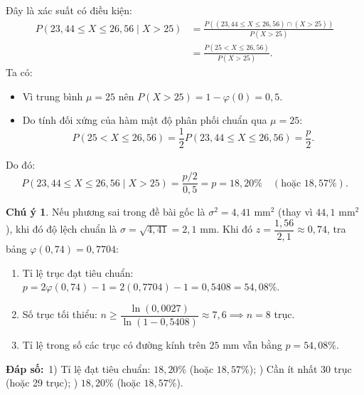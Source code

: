 \documentclass[12pt,a4paper]{article}
\theoremstyle{definition}
\newtheorem*{chuy}{Chú ý}
\newcommand{\dapso}[1]{\noindent\textbf{Đáp số:}\ #1}
\begin{document}
\begin{enumerate}[label=\arabic*)]
    Đây là xác suất có điều kiện:
    \begin{align*}
    P(23{,}44 \le X \le 26{,}56 \mid X > 25) &= \frac{P((23{,}44 \le X \le 26{,}56) \cap (X > 25))}{P(X > 25)} \\
    &= \frac{P(25 < X \le 26{,}56)}{P(X > 25)}.
    \end{align*}
    Ta có:
    \begin{itemize}
        \item Vì trung bình $\mu = 25$ nên $P(X > 25) = 1 - \varphi(0) = 0{,}5$.
        \item Do tính đối xứng của hàm mật độ phân phối chuẩn qua $\mu = 25$:
        \[
        P(25 < X \le 26{,}56) = \frac{1}{2} P(23{,}44 \le X \le 26{,}56) = \frac{p}{2}.
        \]
    \end{itemize}
    Do đó:
    \[
    P(23{,}44 \le X \le 26{,}56 \mid X > 25) = \frac{p / 2}{0{,}5} = p = 18{,}20\% \quad (\text{hoặc } 18{,}57\%).
    \]
\end{enumerate}

\begin{chuy}
Nếu phương sai trong đề bài gốc là $\sigma^2 = 4{,}41\text{ mm}^2$ (thay vì $44{,}1\text{ mm}^2$), khi đó độ lệch chuẩn là $\sigma = \sqrt{4{,}41} = 2{,}1\text{ mm}$.
Khi đó $z = \dfrac{1{,}56}{2{,}1} \approx 0{,}74$, tra bảng $\varphi(0{,}74) = 0{,}7704$:
\begin{enumerate}[label=\arabic*)]
    \item Tỉ lệ trục đạt tiêu chuẩn: $p = 2\varphi(0{,}74) - 1 = 2(0{,}7704) - 1 = 0{,}5408 = 54{,}08\%$.
    \item Số trục tối thiểu: $n \ge \dfrac{\ln(0{,}0027)}{\ln(1 - 0{,}5408)} \approx 7{,}6 \implies n = 8$ trục.
    \item Tỉ lệ trong số các trục có đường kính trên $25\text{ mm}$ vẫn bằng $p = 54{,}08\%$.
\end{enumerate}
\end{chuy}

\dapso{1) Tỉ lệ đạt tiêu chuẩn: $18{,}20\%$ (hoặc $18{,}57\%$); \quad 2) Cần ít nhất 30 trục (hoặc 29 trục); \quad 3) $18{,}20\%$ (hoặc $18{,}57\%$).}
\end{document}
